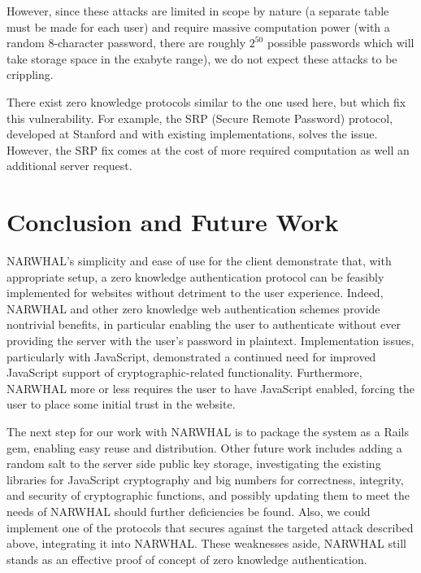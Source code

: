 \documentclass[11pt]{article}
\begin{document}
However, since these attacks are limited in scope by nature (a separate table must be made for each user) and require massive computation power (with a random 8-character password, there are roughly $2^{50}$ possible passwords which will take storage space in the exabyte range), we do not expect these attacks to be crippling.

There exist zero knowledge protocols similar to the one used here, but which fix this vulnerability.  For example, the SRP (Secure Remote Password) protocol, developed at Stanford and with existing implementations, solves the issue.  However, the SRP fix comes at the cost of more required computation as well an additional server request. \cite{Wu} 

\section{Conclusion and Future Work}

NARWHAL's simplicity and ease of use for the client demonstrate that, with appropriate setup, a zero knowledge authentication protocol can be feasibly implemented for websites without detriment to the user experience.  Indeed, NARWHAL and other zero knowledge web authentication schemes provide nontrivial benefits, in particular enabling the user to authenticate without ever providing the server with the user's password in plaintext. Implementation issues, particularly with JavaScript, demonstrated a continued need for improved JavaScript support of cryptographic-related functionality.  Furthermore, NARWHAL more or less requires the user to have JavaScript enabled, forcing the user to place some initial trust in the website.

The next step for our work with NARWHAL is to package the system as a Rails gem, enabling easy reuse and distribution.  Other future work includes adding a random salt to the server side public key storage, investigating the existing libraries for JavaScript cryptography and big numbers for correctness, integrity, and security of cryptographic functions, and possibly updating them to meet the needs of NARWHAL should further deficiencies be found.  Also, we could implement one of the protocols that secures against the targeted attack described above, integrating it into NARWHAL. These weaknesses aside, NARWHAL still stands as an effective proof of concept of zero knowledge authentication.
\end{document}
